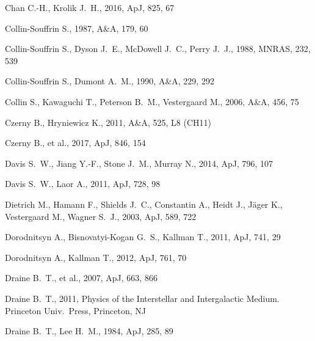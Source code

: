 \documentclass[a4paper,fleqn,usenatbib]{mnras}
\begin{document}
\begin{thebibliography}{99}
 Chan C.-H., Krolik J.~H., 2016, ApJ, 825, 67 

 Collin-Souffrin S., 1987, A\&A, 179, 60 

 Collin-Souffrin S., Dyson J.~E., McDowell J.~C., Perry J.~J., 1988, MNRAS, 232, 539 

 Collin-Souffrin S., Dumont A.~M., 1990, A\&A, 229, 292 

 Collin S., Kawaguchi T., Peterson B.~M., Vestergaard M., 2006, A\&A, 456, 75 

 Czerny B., Hryniewicz K., 2011, A\&A, 525, L8 (CH11)

 Czerny B., et al., 2017, ApJ, 846, 154 

 Davis S.~W., Jiang Y.-F., Stone J.~M., Murray N., 2014, ApJ, 796, 107
 
 Davis S.~W., Laor A., 2011, ApJ, 728, 98 

 Dietrich M., Hamann F., Shields J.~C., Constantin A., Heidt J., J{\"a}ger K., Vestergaard M., Wagner S.~J., 2003, ApJ, 589, 722
 
 Dorodnitsyn A., Bisnovatyi-Kogan G.~S., Kallman T., 2011, ApJ, 741, 29
 
 Dorodnitsyn A., Kallman T., 2012, ApJ, 761, 70 

 Draine B.~T., et al., 2007, ApJ, 663, 866 

 Draine B.~T., 2011, Physics of the Interstellar and Intergalactic Medium. Princeton Univ.\ Press, Princeton, NJ

 Draine B.~T., Lee H.~M., 1984, ApJ, 285, 89 


\end{thebibliography}
\end{document}
